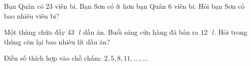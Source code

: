 \begin{bt}[1,5 điểm]
Bạn Quân có $23$ viên bi. Bạn Sơn có ít hơn bạn Quân $6$ viên bi. Hỏi bạn Sơn có bao nhiêu viên bi?
\end{bt}

\begin{bt}[1,0 điểm]
Một thùng chứa đầy $43\text{ }l$ dầu ăn. Buổi sáng cửa hàng đã bán ra $12\text{ }l$. Hỏi trong thùng còn lại bao nhiêu lít dầu ăn?
\end{bt}

\begin{bt}[1,0 điểm]
Điền số thích hợp vào chỗ chấm: $2, 5, 8, 11, \dots, \dots$
\end{bt}
